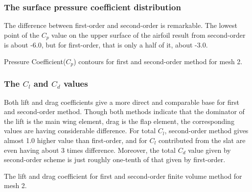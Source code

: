 \documentclass[letterpaper,onecolumn,12pt]{article}
\makeatletter
\newenvironment{tablehere}
  {\def\@captype{table}}{}
\newenvironment{figurehere}
  {\def\@captype{figure}}{}
\makeatother
\begin{document}
\subsubsection{The surface pressure coefficient distribution}
The difference between first-order and second-order is remarkable. The lowest point of the $C_p$ value on the upper surface of the airfoil result from second-order is about -6.0, but for first-order, that is only a half of it, about -3.0.

\begin{figurehere}
 \centering 
  \hspace{.05cm} 
  \caption{Pressure Coefficient($C_p$) contours for first and second-order method for mesh 2.} 
\end{figurehere}

\subsubsection{The $C_l$ and $C_d$ values}
Both lift and drag coefficients give a  more direct and comparable base for first and second-order method. Though both methods indicate that the dominator of the lift is the main wing element, drag is the flap element, the corresponding values are having considerable difference. For total $C_l$, second-order method gives almost 1.0 higher value than first-order, and for $C_l$ contributed from the slat are even having about 3 times difference. Moreover, the total $C_d$ value given by second-order scheme is just roughly one-tenth of that given by first-order.

\bigskip

\begin{tablehere}
\centering
{}
\qquad
{}
\caption{The lift and drag coefficient for first and second-order finite volume method for mesh 2.}
\end{tablehere} 
\end{document}
